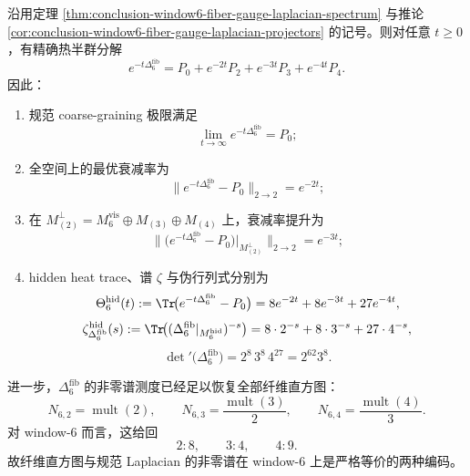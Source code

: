 \begin{theorem}\label{thm:conclusion-window6-three-temperature-hidden-cooling-spectral-holography}
沿用定理 \ref{thm:conclusion-window6-fiber-gauge-laplacian-spectrum} 与推论 \ref{cor:conclusion-window6-fiber-gauge-laplacian-projectors} 的记号。则对任意 \(t\ge 0\)，有精确热半群分解
\[
e^{-t\Delta_6^{\mathrm{fib}}}
=
P_0+e^{-2t}P_2+e^{-3t}P_3+e^{-4t}P_4.
\]
因此：
\begin{enumerate}
  \item 规范 coarse-graining 极限满足
  \[
  \lim_{t\to\infty}e^{-t\Delta_6^{\mathrm{fib}}}=P_0;
  \]
  \item 全空间上的最优衰减率为
  \[
  \bigl\|e^{-t\Delta_6^{\mathrm{fib}}}-P_0\bigr\|_{2\to 2}=e^{-2t};
  \]
  \item 在 \(M_{(2)}^\perp=M_6^{\mathrm{vis}}\oplus M_{(3)}\oplus M_{(4)}\) 上，衰减率提升为
  \[
  \bigl\|\bigl(e^{-t\Delta_6^{\mathrm{fib}}}-P_0\bigr)\big|_{M_{(2)}^\perp}\bigr\|_{2\to 2}=e^{-3t};
  \]
  \item hidden heat trace、谱 \(\zeta\) 与伪行列式分别为
  \[
  \Theta_6^{\mathrm{hid}}(t)
  :=\Tr\!\bigl(e^{-t\Delta_6^{\mathrm{fib}}}-P_0\bigr)
  =
  8e^{-2t}+8e^{-3t}+27e^{-4t},
  \]
  \[
  \zeta_{\Delta_6^{\mathrm{fib}}}^{\mathrm{hid}}(s)
  :=
  \Tr\!\bigl((\Delta_6^{\mathrm{fib}}|_{M_6^{\mathrm{hid}}})^{-s}\bigr)
  =
  8\cdot 2^{-s}+8\cdot 3^{-s}+27\cdot 4^{-s},
  \]
  \[
  \det\nolimits'\!\bigl(\Delta_6^{\mathrm{fib}}\bigr)=2^8\,3^8\,4^{27}=2^{62}3^8.
  \]
\end{enumerate}
进一步，\(\Delta_6^{\mathrm{fib}}\) 的非零谱测度已经足以恢复全部纤维直方图：
\[
N_{6,2}=\operatorname{mult}(2),
\qquad
N_{6,3}=\frac{\operatorname{mult}(3)}{2},
\qquad
N_{6,4}=\frac{\operatorname{mult}(4)}{3}.
\]
对 window-\(6\) 而言，这给回
\[
2:8,\qquad 3:4,\qquad 4:9.
\]
故纤维直方图与规范 Laplacian 的非零谱在 window-\(6\) 上是严格等价的两种编码。
\end{theorem}
